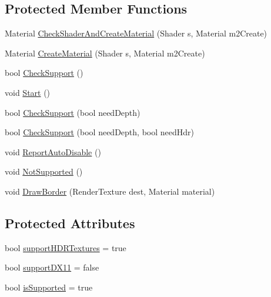 \subsection*{Protected Member Functions}
\begin{DoxyCompactItemize}
\item 
Material \mbox{\hyperlink{class_unity_standard_assets_1_1_image_effects_1_1_post_effects_base_aaf026c79c57ca6862aab5d0fd0aa6cc6}{Check\+Shader\+And\+Create\+Material}} (Shader s, Material m2\+Create)
\item 
Material \mbox{\hyperlink{class_unity_standard_assets_1_1_image_effects_1_1_post_effects_base_a094b34a919f4464b894a5645feb5e97d}{Create\+Material}} (Shader s, Material m2\+Create)
\item 
bool \mbox{\hyperlink{class_unity_standard_assets_1_1_image_effects_1_1_post_effects_base_ad8aac442bf04a0767c8060bbd290ecee}{Check\+Support}} ()
\item 
void \mbox{\hyperlink{class_unity_standard_assets_1_1_image_effects_1_1_post_effects_base_a701b58ca625f3920f128f850235007f8}{Start}} ()
\item 
bool \mbox{\hyperlink{class_unity_standard_assets_1_1_image_effects_1_1_post_effects_base_aaa6ffafa1623a2716c0c80118a5c46ea}{Check\+Support}} (bool need\+Depth)
\item 
bool \mbox{\hyperlink{class_unity_standard_assets_1_1_image_effects_1_1_post_effects_base_a52ae735f5a89cf323b9f33b2115f3520}{Check\+Support}} (bool need\+Depth, bool need\+Hdr)
\item 
void \mbox{\hyperlink{class_unity_standard_assets_1_1_image_effects_1_1_post_effects_base_ab5e0ddeb8eef7651c566d78c9b3b0d4b}{Report\+Auto\+Disable}} ()
\item 
void \mbox{\hyperlink{class_unity_standard_assets_1_1_image_effects_1_1_post_effects_base_a57dc8025f94e36483c53b482cd289d99}{Not\+Supported}} ()
\item 
void \mbox{\hyperlink{class_unity_standard_assets_1_1_image_effects_1_1_post_effects_base_a111dac8859a0c49146813131057b9630}{Draw\+Border}} (Render\+Texture dest, Material material)
\end{DoxyCompactItemize}
\subsection*{Protected Attributes}
\begin{DoxyCompactItemize}
\item 
bool \mbox{\hyperlink{class_unity_standard_assets_1_1_image_effects_1_1_post_effects_base_afe07c7112eeb27534eabb78239ef7613}{support\+H\+D\+R\+Textures}} = true
\item 
bool \mbox{\hyperlink{class_unity_standard_assets_1_1_image_effects_1_1_post_effects_base_ac75c4f2bba947de476c75a262822a24c}{support\+D\+X11}} = false
\item 
bool \mbox{\hyperlink{class_unity_standard_assets_1_1_image_effects_1_1_post_effects_base_a5084bc03b21b083a1ef01a9cbb5c1f37}{is\+Supported}} = true
\end{DoxyCompactItemize}


